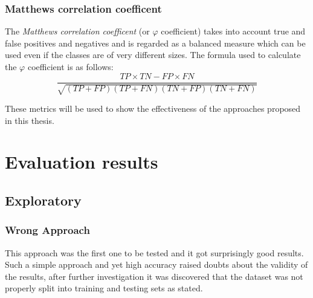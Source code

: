             \subsubsection{Matthews correlation coefficent} 

                The \textit{Matthews correlation coefficent} (or $\varphi$ coefficient) takes into account true and false positives and negatives and is regarded as a balanced measure which can be used even if the classes are of very different sizes. The formula used to calculate the $\varphi$ coefficient is as follows: 
                \begin{equation}
                    \frac{TP \times TN - FP \times FN}{\sqrt{(TP + FP)(TP + FN)(TN + FP)(TN + FN)}}
                \end{equation}

            These metrics will be used to show the effectiveness of the approaches proposed in this thesis.
    
    \section{Evaluation results}
        
        
        \subsection{Exploratory}

            \subsubsection{Wrong Approach}
                This approach was the first one to be tested and it got surprisingly good results. Such a simple approach and yet high accuracy raised doubts about the validity of the results, after further investigation it was discovered that the dataset was not properly split into training and testing sets as stated.
            
